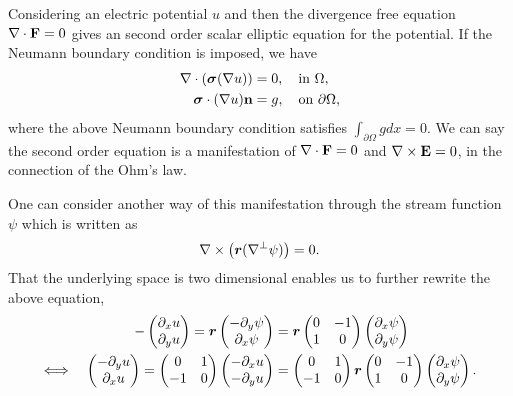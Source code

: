 \documentclass[11pt]{amsart}
\theoremstyle{plain}
\theoremstyle{remark}
\numberwithin{equation}{section}
\numberwithin{Thm}{section}
\def\F{{\bf F}}
\def\E{{\bf E}}
\def\r{{\bf r}}
\def\n{{\bf n}}
\def\Sigma{\mbox{\boldmath$\sigma$}}
\def\r{\mbox{\boldmath$r$}}
\begin{document}
Considering an electric potential $u$ and then the divergence free equation $\nabla\cdot\F=0$ gives an second order scalar elliptic equation for the potential. If the Neumann boundary condition is imposed, we have
\begin{align}
\nabla\cdot(\Sigma(\nabla u))  &=0, \quad \text{in $\Omega$},\label{ellipticeqn}\\
\Sigma\cdot(\nabla u)\n&=g, \quad \text{on $\partial\Omega$},\label{Neumann}
\end{align}
where the above Neumann boundary condition satisfies $\int_{\partial\Omega}gdx=0$. We can say the second order equation is a manifestation of $\nabla\cdot\F=0$ and $\nabla\times\E=0$, in the connection of the Ohm's law. 

One can consider another way of this manifestation through the stream function $\psi$ which is written as
\begin{equation}\label{curlfreeA}
\nabla\times\big(\r(\nabla^\perp\psi)\big)=0.
\end{equation}
That the underlying space is two dimensional enables us to further rewrite the above equation,
\begin{align*}
-\begin{pmatrix} \partial_x u \\ \partial_y u \end{pmatrix}
=\r \begin{pmatrix} -\partial_y \psi \\ \partial_x \psi \end{pmatrix}
&=\r \begin{pmatrix} 0 & -1 \\ 1 & 0 \end{pmatrix} \begin{pmatrix} \partial_x \psi \\  \partial_y \psi \end{pmatrix}\\
\Longleftrightarrow \quad \begin{pmatrix} -\partial_y u \\ \partial_x u \end{pmatrix} = \begin{pmatrix} 0 & 1 \\ -1 & 0 \end{pmatrix} \begin{pmatrix} -\partial_x u \\ -\partial_y u \end{pmatrix}  &=  \begin{pmatrix} 0 & 1 \\ -1 & 0 \end{pmatrix} \r \begin{pmatrix} 0 & -1 \\ 1 & 0 \end{pmatrix} \begin{pmatrix} \partial_x \psi \\  \partial_y \psi \end{pmatrix}.
\end{align*}
\end{document}
